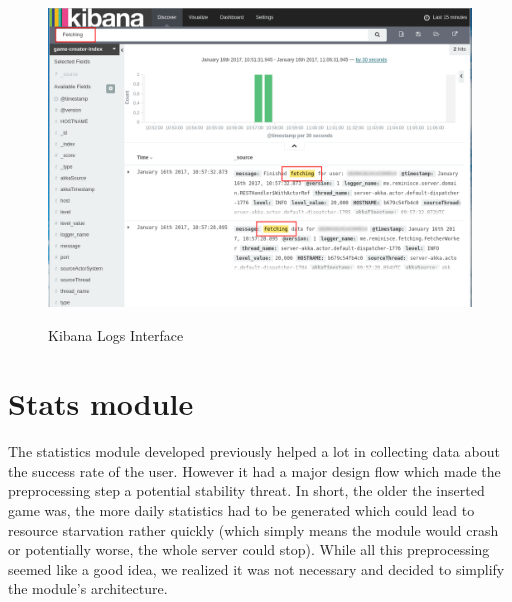 \begin{figure}
\centering
{\includegraphics[width=6in]{images/kibana.png}}
\caption{Kibana Logs Interface}
\label{fig:kibana}
\end{figure}


\section{Stats module}\label{sec:stats}
The statistics module developed previously helped a lot in collecting data about the success rate of the user. However it had a major design flow which made the preprocessing step a potential stability threat. In short, the older the inserted game was, the more daily statistics had to be generated which could lead to resource starvation rather quickly (which simply means the module would crash or potentially worse, the whole server could stop). While all this preprocessing seemed like a good idea, we realized it was not necessary and decided to simplify the module's architecture.

